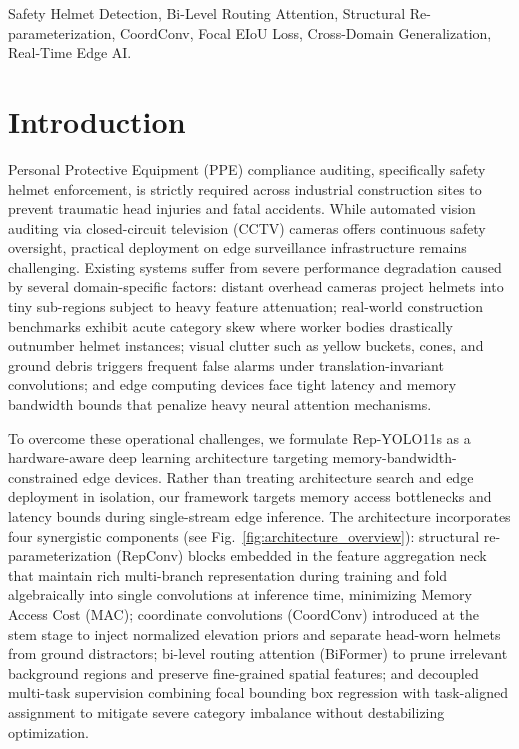 \documentclass[conference]{IEEEtran}
\begin{document}
\begin{IEEEkeywords}
Safety Helmet Detection, Bi-Level Routing Attention, Structural Re-parameterization, CoordConv, Focal EIoU Loss, Cross-Domain Generalization, Real-Time Edge AI.
\end{IEEEkeywords}

\section{Introduction}
\label{sec:intro}
Personal Protective Equipment (PPE) compliance auditing, specifically safety helmet enforcement, is strictly required across industrial construction sites to prevent traumatic head injuries and fatal accidents. While automated vision auditing via closed-circuit television (CCTV) cameras offers continuous safety oversight, practical deployment on edge surveillance infrastructure remains challenging. Existing systems suffer from severe performance degradation caused by several domain-specific factors: distant overhead cameras project helmets into tiny sub-regions subject to heavy feature attenuation; real-world construction benchmarks exhibit acute category skew where worker bodies drastically outnumber helmet instances; visual clutter such as yellow buckets, cones, and ground debris triggers frequent false alarms under translation-invariant convolutions; and edge computing devices face tight latency and memory bandwidth bounds that penalize heavy neural attention mechanisms.

To overcome these operational challenges, we formulate Rep-YOLO11s as a hardware-aware deep learning architecture targeting memory-bandwidth-constrained edge devices. Rather than treating architecture search and edge deployment in isolation, our framework targets memory access bottlenecks and latency bounds during single-stream edge inference. The architecture incorporates four synergistic components (see Fig.~\ref{fig:architecture_overview}): structural re-parameterization (RepConv) blocks embedded in the feature aggregation neck that maintain rich multi-branch representation during training and fold algebraically into single convolutions at inference time, minimizing Memory Access Cost (MAC); coordinate convolutions (CoordConv) introduced at the stem stage to inject normalized elevation priors and separate head-worn helmets from ground distractors; bi-level routing attention (BiFormer) to prune irrelevant background regions and preserve fine-grained spatial features; and decoupled multi-task supervision combining focal bounding box regression with task-aligned assignment to mitigate severe category imbalance without destabilizing optimization.
\end{document}
